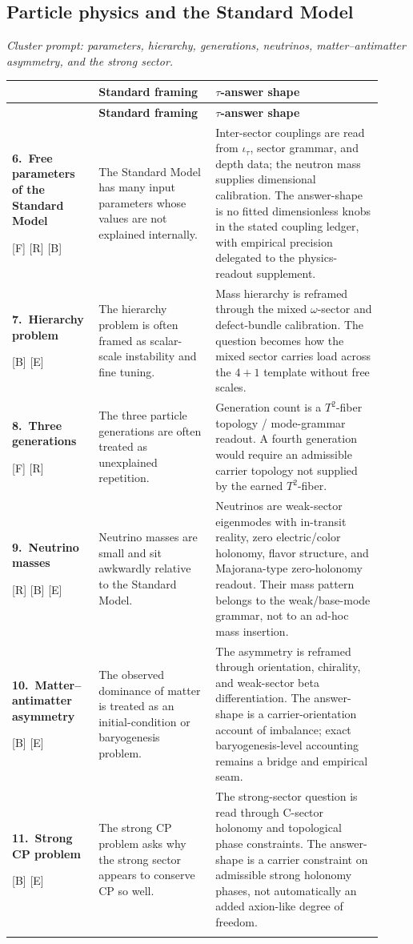\documentclass{pantarhei-researchnote}
\makeatletter
\newcommand{\Ftag}{\textcolor{pr-brand-700}{\textsc{[F]}}}
\newcommand{\Rtag}{\textcolor{pr-lane-verify}{\textsc{[R]}}}
\newcommand{\Btag}{\textcolor{pr-lane-results}{\textsc{[B]}}}
\newcommand{\Etag}{\textcolor{pr-lane-publications}{\textsc{[E]}}}
\newcommand{\ledgerprompt}[1]{%
  \par\smallskip
  {\small\itshape\color{pr-ink-600}#1\par}
  \vspace{0.35em}
}
\newcommand{\ledgerrow}[5]{%
  \textbf{#1.\ #2}\par{\scriptsize\sffamily #5} &
  #3 &
  #4 \\
  \addlinespace[0.35em]
}
\newenvironment{clusterledger}{%
  \renewcommand{\arraystretch}{1.18}%
  \footnotesize
  \begin{longtable}{@{}>{\RaggedRight\arraybackslash}p{0.19\linewidth}%
    >{\RaggedRight\arraybackslash}p{0.30\linewidth}%
    >{\RaggedRight\arraybackslash}p{0.43\linewidth}@{}}
  \toprule
  {\sffamily\bfseries\color{pr-brand-700}Question} &
  {\sffamily\bfseries\color{pr-brand-700}Standard framing} &
  {\sffamily\bfseries\color{pr-brand-700}\(\tau\)-answer shape} \\
  \midrule
  \endfirsthead
  \toprule
  {\sffamily\bfseries\color{pr-brand-700}Question} &
  {\sffamily\bfseries\color{pr-brand-700}Standard framing} &
  {\sffamily\bfseries\color{pr-brand-700}\(\tau\)-answer shape} \\
  \midrule
  \endhead
}{%
  \bottomrule
  \end{longtable}
  \normalsize
}
\makeatother
\begin{document}
\subsection{Particle physics and the Standard Model}
\ledgerprompt{Cluster prompt: parameters, hierarchy, generations, neutrinos,
matter--antimatter asymmetry, and the strong sector.}
\begin{clusterledger}
\ledgerrow{6}{Free parameters of the Standard Model}
{The Standard Model has many input parameters whose values are not explained
internally.}
{Inter-sector couplings are read from \(\iota_\tau\), sector grammar, and
depth data; the neutron mass supplies dimensional calibration. The
answer-shape is no fitted dimensionless knobs in the stated coupling ledger,
with empirical precision delegated to the physics-readout supplement.}
{\Ftag{} \Rtag{} \Btag}
\ledgerrow{7}{Hierarchy problem}
{The hierarchy problem is often framed as scalar-scale instability and fine
tuning.}
{Mass hierarchy is reframed through the mixed \(\omega\)-sector and
defect-bundle calibration. The question becomes how the mixed sector carries
load across the \(4+1\) template without free scales.}
{\Btag{} \Etag}
\ledgerrow{8}{Three generations}
{The three particle generations are often treated as unexplained repetition.}
{Generation count is a \(T^2\)-fiber topology / mode-grammar readout. A
fourth generation would require an admissible carrier topology not supplied
by the earned \(T^2\)-fiber.}
{\Ftag{} \Rtag}
\ledgerrow{9}{Neutrino masses}
{Neutrino masses are small and sit awkwardly relative to the Standard Model.}
{Neutrinos are weak-sector eigenmodes with in-transit reality, zero
electric/color holonomy, flavor structure, and Majorana-type zero-holonomy
readout. Their mass pattern belongs to the weak/base-mode grammar, not to an
ad-hoc mass insertion.}
{\Rtag{} \Btag{} \Etag}
\ledgerrow{10}{Matter--antimatter asymmetry}
{The observed dominance of matter is treated as an initial-condition or
baryogenesis problem.}
{The asymmetry is reframed through orientation, chirality, and weak-sector
beta differentiation. The answer-shape is a carrier-orientation account of
imbalance; exact baryogenesis-level accounting remains a bridge and empirical
seam.}
{\Btag{} \Etag}
\ledgerrow{11}{Strong CP problem}
{The strong CP problem asks why the strong sector appears to conserve CP so
well.}
{The strong-sector question is read through C-sector holonomy and topological
phase constraints. The answer-shape is a carrier constraint on admissible
strong holonomy phases, not automatically an added axion-like degree of
freedom.}
{\Btag{} \Etag}
\end{clusterledger}
\end{document}
